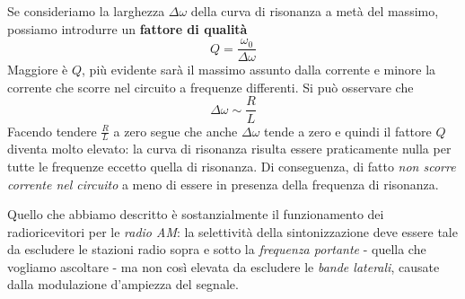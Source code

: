 Se consideriamo la larghezza $\Delta \omega$ della curva di risonanza a metà del massimo, possiamo introdurre un \textbf{fattore di qualità}
\begin{equation}
	Q=\frac{\omega_0}{\Delta \omega}
\end{equation}
Maggiore è $Q$, più evidente sarà il massimo assunto dalla corrente e minore la corrente che scorre nel circuito a frequenze differenti. Si può osservare che
\begin{equation}
	\Delta \omega\sim \frac{R}{L}
\end{equation}
Facendo tendere $\frac{R}{L}$ a zero segue che anche $\Delta \omega$ tende a zero e quindi il fattore $Q$ diventa molto elevato: la curva di risonanza risulta essere praticamente nulla per tutte le frequenze eccetto quella di risonanza. Di conseguenza, di fatto \textit{non scorre corrente nel circuito} a meno di essere in presenza della frequenza di risonanza.

Quello che abbiamo descritto è sostanzialmente il funzionamento dei radioricevitori per le \textit{radio AM}: la selettività della sintonizzazione deve essere tale da escludere le stazioni radio sopra e sotto la \textit{frequenza portante} - quella che vogliamo ascoltare -  ma non così elevata da escludere le \textit{bande laterali}, causate dalla modulazione d'ampiezza del segnale.

